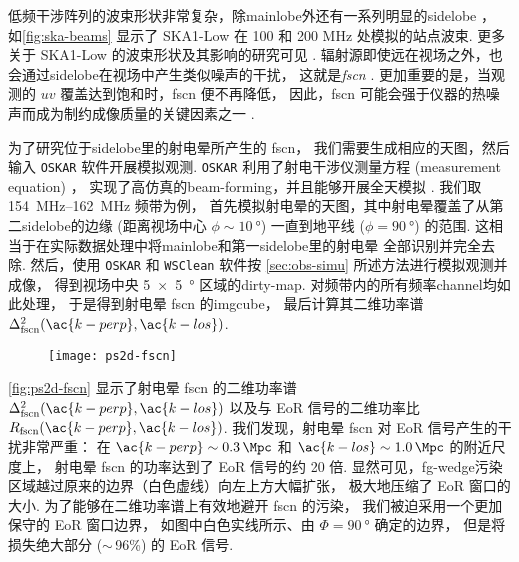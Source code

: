 低频干涉阵列的波束形状非常复杂，除\ac{mainlobe}外还有一系列明显的\ac{sidelobe}
\cite{noordam2004,wijnholds2010}，
如\autoref{fig:ska-beams} 显示了 SKA1-Low 在 100 和 200 MHz 处模拟的站点波束.
更多关于 SKA1-Low 的波束形状及其影响的研究可见 .
辐射源即使远在视场之外，也会通过\ac{sidelobe}在视场中产生类似噪声的干扰，
这就是\emph{\acf{fscn}} \cite{smirnov2012}.
更加重要的是，当观测的 $uv$ 覆盖达到饱和时，\ac{fscn} 便不再降低，
因此，\ac{fscn} 可能会强于仪器的热噪声而成为制约成像质量的关键因素之一 \cite{mort2017}.

为了研究位于\ac{sidelobe}里的射电晕所产生的 \ac{fscn}，
我们需要生成相应的天图，然后输入 \texttt{OSKAR} 软件开展模拟观测.
\texttt{OSKAR} 利用了射电干涉仪测量方程 (measurement equation) \cite{smirnov2011}，
实现了高仿真的\ac{beam-forming}，并且能够开展全天模拟 \cite{mort2010}.
我们取 \SIrange{154}{162}{\MHz} 频带为例，
首先模拟射电晕的天图，其中射电晕覆盖了从第二\ac{sidelobe}的边缘
(距离视场中心 $\phi \sim \SI{10}{\degree}$)
一直到地平线 ($\phi = \SI{90}{\degree}$) 的范围.
这相当于在实际数据处理中将\ac{mainlobe}和第一\ac{sidelobe}里的射电晕
全部识别并完全去除.
然后，使用 \texttt{OSKAR} 和 \texttt{WSClean} 软件按
\autoref{sec:obs-simu} 所述方法进行模拟观测并成像，
得到视场中央 \SI{5 x 5}{\degree} 区域的\ac{dirty-map}.
对频带内的所有频率\ac{channel}均如此处理，
于是得到射电晕 \ac{fscn} 的\ac{imgcube}，
最后计算其二维功率谱 $\Delta^2_{\R{fscn}}(\ac{k-perp}, \ac{k-los})$.

\begin{figure}[htp]
  \centering
  \texttt{[image: ps2d-fscn]}
  \label{fig:ps2d-fscn}
\end{figure}

\autoref{fig:ps2d-fscn} 显示了射电晕 \ac{fscn}
的二维功率谱 $\Delta^2_{\R{fscn}}(\ac{k-perp}, \ac{k-los})$
以及与 EoR 信号的二维功率比 $R_{\R{fscn}}(\ac{k-perp}, \ac{k-los})$.
我们发现，射电晕 \ac{fscn} 对 EoR 信号产生的干扰非常严重：
在 $\ac{k-perp} \sim \SI{0.3}{\per\Mpc}$
和 $\ac{k-los} \sim \SI{1.0}{\per\Mpc}$ 的附近尺度上，
射电晕 \ac{fscn} 的功率达到了 EoR 信号的约 20 倍.
显然可见，\ac{fg-wedge}污染区域越过原来的边界（白色虚线）向左上方大幅扩张，
极大地压缩了 EoR 窗口的大小.
为了能够在二维功率谱上有效地避开 \ac{fscn} 的污染，
我们被迫采用一个更加保守的 EoR 窗口边界，
如图中白色实线所示、由 $\Phi = \SI{90}{\degree}$ 确定的边界，
但是将损失绝大部分 ($\sim$\,96\%) 的 EoR 信号.

